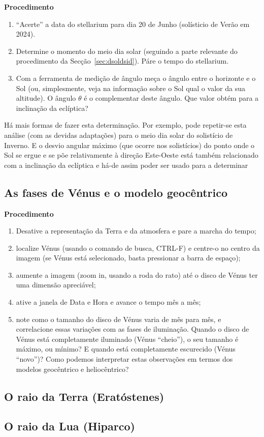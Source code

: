 \documentclass{article}
\begin{document}
\noindent
\textbf{Procedimento}
\begin{enumerate}
  \item ``Acerte'' a data do stellarium para dia 20 de Junho (solísticio de
    Verão em 2024).
  \item Determine o momento do meio dia solar (seguindo a parte relevante do
    procedimento da Secção~\ref{sec:dsoldsid}). Páre o tempo do stellarium.
  \item
    Com a ferramenta de medição de ângulo meça o ângulo entre o horizonte e o
    Sol (ou, simplesmente, veja na informação sobre o Sol qual o valor da sua
    altitude). O ângulo $\theta$ é o complementar deste ângulo. Que valor obtém
    para a inclinação da eclíptica?
\end{enumerate}
Há mais formas de fazer esta determinação. Por exemplo, pode repetir-se esta
análise (com as devidas adaptações) para o meio dia solar do solistício de
Inverno. E o desvio angular máximo (que ocorre nos solistícios) do ponto onde o
Sol se ergue e se põe relativamente à direção Este-Oeste está também relacionado
com a inclinação da eclíptica e há-de assim poder ser usado para a determinar


\subsection{As fases de Vénus e o modelo geocêntrico}
\textbf{Procedimento}
\begin{enumerate}
  \item
    Desative a representação da Terra e da atmosfera e pare a marcha do tempo;
  \item
    localize Vénus (usando o comando de busca, CTRL-F) e centre-o no centro da
    imagem (se Vénus está selecionado, basta pressionar a barra de espaço);
  \item
    aumente a imagem (zoom in, usando a roda do rato) até o disco de Vénus ter
    uma dimensão apreciável;
  \item
    ative a janela de Data e Hora e avance o tempo mês a mês;
  \item
    note como o tamanho do disco de Vénus varia de mês para mês, e correlacione
    essas variações com as fases de iluminação. Quando o disco de Vénus está
    completamente iluminado (Vénus ``cheio''), o seu tamanho é máximo, ou
    mínimo? E quando está completamente escurecido (Vénus ``novo'')? Como
    podemos interpretar estas observações em termos dos modelos geocêntrico e
    heliocêntrico?

\end{enumerate}

\subsection{O raio da Terra (Eratóstenes)}
\subsection{O raio da Lua (Hiparco)}
\end{document}
